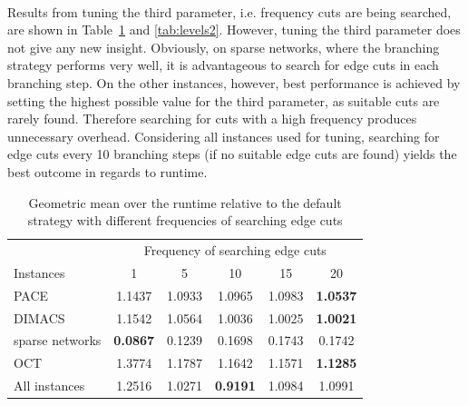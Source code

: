 \documentclass[12pt,a4paper,twoside]{scrartcl}
\numberwithin{equation}{section}
\begin{document}
\paragraph{}
Results from tuning the third parameter, i.e. frequency cuts are being searched, are shown in Table~\ref{tab:levels1} and \ref{tab:levels2}. However, tuning the third  parameter does not give any new insight. Obviously, on sparse networks, where the branching strategy performs very well, it is advantageous to search for edge cuts in each branching step. On the other instances, however, best performance is achieved by setting the highest possible value for the third parameter, as suitable cuts are rarely found. Therefore searching for cuts with a high frequency produces unnecessary overhead. Considering all instances used for tuning, searching for edge cuts every 10 branching steps (if no suitable edge cuts are found) yields the best outcome in regards to runtime.

\begin{table}[hbt!]
	\centering
	\begin{tabular}{l|ccccc|}	  & \multicolumn{5}{c|}{Frequency of searching edge cuts} \\ \cline{2-6}
		Instances & 1 & 5 & 10 & 15 & 20\\
		\hline
		PACE & 1.1437 & 1.0933 & 1.0965 & 1.0983 & \textbf{1.0537} \\
		DIMACS & 1.1542 & 1.0564 & 1.0036 & 1.0025 & \textbf{1.0021} \\
		sparse networks & \textbf{0.0867} & 0.1239 & 0.1698 & 0.1743 & 0.1742 \\
		OCT & 1.3774 & 1.1787 & 1.1642 & 1.1571 & \textbf{1.1285} \\
		All instances & 1.2516 & 1.0271 & \textbf{0.9191} & 1.0984 & 1.0991 \\\hline
	\end{tabular}
	
	\caption{Geometric mean over the runtime relative to the default strategy with different frequencies of searching edge cuts}
	\label{tab:levels1}
	
\end{table}
\end{document}
